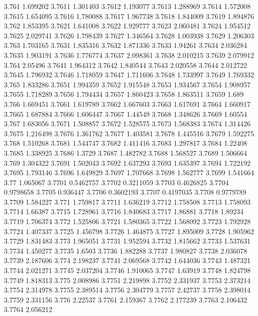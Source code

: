 3.761  1.699202
3.7611  1.301403
3.7612  1.193077
3.7613  1.288969
3.7614  1.572008
3.7615  1.654095
3.7616  1.780088
3.7617  1.967738
3.7618  1.844009
3.7619  1.894876
3.762  1.853395
3.7621  1.641008
3.7622  1.929777
3.7623  2.060481
3.7624  1.954512
3.7625  2.029741
3.7626  1.798439
3.7627  1.346564
3.7628  1.003938
3.7629  1.206303
3.763  1.703165
3.7631  1.835316
3.7632  1.871336
3.7633  1.94261
3.7634  2.036284
3.7635  1.903191
3.7636  1.776774
3.7637  2.098361
3.7638  2.010215
3.7639  2.079912
3.764  2.05496
3.7641  1.964312
3.7642  1.840544
3.7643  2.020558
3.7644  2.012722
3.7645  1.796932
3.7646  1.718059
3.7647  1.711606
3.7648  1.733997
3.7649  1.769332
3.765  1.833286
3.7651  1.994359
3.7652  1.915548
3.7653  1.934567
3.7654  1.908957
3.7655  1.718289
3.7656  1.794434
3.7657  1.860423
3.7658  1.863511
3.7659  1.689
3.766  1.669451
3.7661  1.619789
3.7662  1.667603
3.7663  1.617691
3.7664  1.660917
3.7665  1.687884
3.7666  1.606447
3.7667  1.44549
3.7668  1.348626
3.7669  1.60554
3.767  1.683056
3.7671  1.508857
3.7672  1.528575
3.7673  1.568383
3.7674  1.314426
3.7675  1.216498
3.7676  1.361762
3.7677  1.403581
3.7678  1.445516
3.7679  1.592275
3.768  1.510268
3.7681  1.544747
3.7682  1.411416
3.7683  1.297817
3.7684  1.22408
3.7685  1.338925
3.7686  1.3729
3.7687  1.482782
3.7688  1.568527
3.7689  1.506664
3.769  1.304322
3.7691  1.502043
3.7692  1.637293
3.7693  1.635397
3.7694  1.722192
3.7695  1.793146
3.7696  1.649829
3.7697  1.707668
3.7698  1.562777
3.7699  1.541664
3.77  1.065067
3.7701  0.5462757
3.7702  0.3211059
3.7703  0.4626825
3.7704  0.9798658
3.7705  0.936447
3.7706  0.3602193
3.7707  0.4197035
3.7708  0.9779789
3.7709  1.584227
3.771  1.759817
3.7711  1.636219
3.7712  1.758508
3.7713  1.758093
3.7714  1.66387
3.7715  1.728961
3.7716  1.840683
3.7717  1.86881
3.7718  1.89234
3.7719  1.706374
3.772  1.525806
3.7721  1.580365
3.7722  1.568092
3.7723  1.792928
3.7724  1.407337
3.7725  1.456798
3.7726  1.464875
3.7727  1.895009
3.7728  1.905962
3.7729  1.831483
3.773  1.965051
3.7731  1.952594
3.7732  1.815662
3.7733  1.537631
3.7734  1.450277
3.7735  1.6503
3.7736  1.882288
3.7737  1.980827
3.7738  2.036078
3.7739  2.187606
3.774  2.198237
3.7741  2.069568
3.7742  1.644036
3.7743  1.487321
3.7744  2.021271
3.7745  2.037204
3.7746  1.910065
3.7747  1.63919
3.7748  1.824798
3.7749  1.818313
3.775  2.008986
3.7751  2.219898
3.7752  2.331937
3.7753  2.373214
3.7754  2.314978
3.7755  2.389514
3.7756  2.304779
3.7757  2.42737
3.7758  2.398014
3.7759  2.331156
3.776  2.22537
3.7761  2.159367
3.7762  2.177239
3.7763  2.106432
3.7764  2.056212

